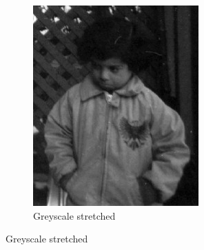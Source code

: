 \documentclass{article}
\begin{document}
\begin{itemize}
\begin{figure}[h]
\begin{subfigure}{.45\textwidth}
        \includegraphics[width=\linewidth]{./result/labwork7-gpu-out.jpg}
        \caption{Greyscale stretched}
      \end{subfigure}
    \end{figure}
\end{itemize}
\end{document}
